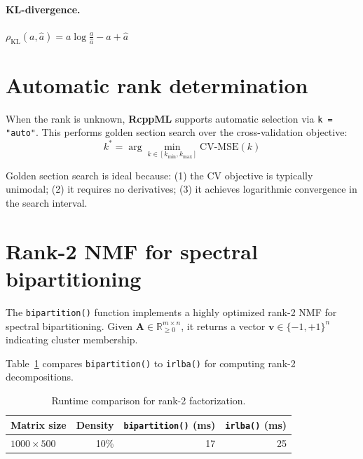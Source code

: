 \documentclass[11pt]{article}
\newcommand{\pkg}[1]{\textbf{#1}}
\newcommand{\code}[1]{\texttt{#1}}
\newcommand{\fct}[1]{\code{#1()}}
\begin{document}
\paragraph{KL-divergence.}
$\rho_{\text{KL}}(a, \hat{a}) = a \log\frac{a}{\hat{a}} - a + \hat{a}$


\section{Automatic rank determination} \label{sec:automatic}

When the rank is unknown, \pkg{RcppML} supports automatic selection via 
\code{k = "auto"}. This performs golden section search \citep{Kiefer1953} over 
the cross-validation objective:
\begin{equation}
  k^* = \arg\min_{k \in [k_{\min}, k_{\max}]} \text{CV-MSE}(k)
\end{equation}

Golden section search is ideal because: (1) the CV objective is typically 
unimodal; (2) it requires no derivatives; (3) it achieves logarithmic 
convergence in the search interval.


\section{Rank-2 NMF for spectral bipartitioning} \label{sec:bipartition}

The \fct{bipartition} function implements a highly optimized rank-2 NMF 
for spectral bipartitioning. Given $\mathbf{A} \in \mathbb{R}_{\geq 0}^{m \times n}$, 
it returns a vector $\mathbf{v} \in \{-1, +1\}^n$ indicating cluster membership.

Table~\ref{tab:bipartition} compares \fct{bipartition} to \fct{irlba} 
\citep{Baglama2005} for computing rank-2 decompositions.

\begin{table}[t]
\centering
\begin{tabular}{lrrr}
\toprule
Matrix size & Density & \fct{bipartition} (ms) & \fct{irlba} (ms) \\
\midrule
$1000 \times 500$ & 10\% & 17 & 25 \\
\bottomrule
\end{tabular}
\caption{\label{tab:bipartition}Runtime comparison for rank-2 factorization.}
\end{table}
\end{document}
